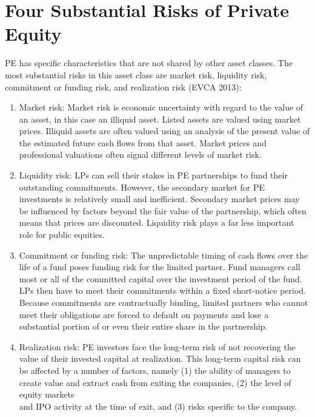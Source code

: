 \documentclass[11pt]{article}
\begin{document}
\section*{Four Substantial Risks of Private Equity}
PE has specific characteristics that are not shared by other asset classes. The most substantial risks in this asset class are market risk, liquidity risk, commitment or funding risk, and realization risk (EVCA 2013):

\begin{enumerate}
  \item Market risk: Market risk is economic uncertainty with regard to the value of an asset, in this case an illiquid asset. Listed assets are valued using market prices. Illiquid assets are often valued using an analysis of the present value of the estimated future cash flows from that asset. Market prices and professional valuations often signal different levels of market risk.

  \item Liquidity risk: LPs can sell their stakes in PE partnerships to fund their outstanding commitments. However, the secondary market for PE investments is relatively small and inefficient. Secondary market prices may be influenced by factors beyond the fair value of the partnership, which often means that prices are discounted. Liquidity risk plays a far less important role for public equities.

  \item Commitment or funding risk: The unpredictable timing of cash flows over the life of a fund poses funding risk for the limited partner. Fund managers call most or all of the committed capital over the investment period of the fund. LPs then have to meet their commitments within a fixed short-notice period. Because commitments are contractually binding, limited partners who cannot meet their obligations are forced to default on payments and lose a substantial portion of or even their entire share in the partnership.

  \item Realization risk: PE investors face the long-term risk of not recovering the value of their invested capital at realization. This long-term capital risk can be affected by a number of factors, namely (1) the ability of managers to create value and extract cash from exiting the companies, (2) the level of equity markets\\
and IPO activity at the time of exit, and (3) risks specific to the company.

\end{enumerate}
\end{document}
